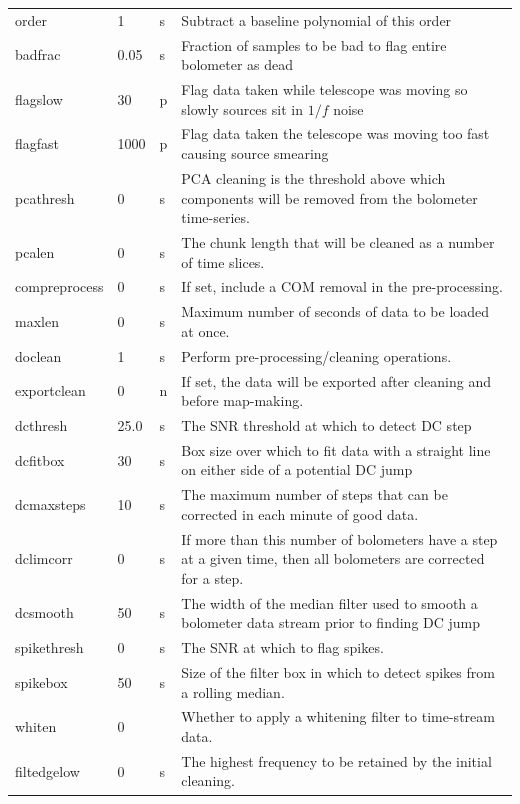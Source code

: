 \documentclass[twoside,11pt]{article}
\renewcommand{\_}{\texttt{\symbol{95}}}
\begin{document}
\begin{htmlonly}
\begin{table}
\begin{center}
\begin{footnotesize}
\begin{tabular}{|p{2.1cm}|p{0.8cm}|p{0.2cm}|p{11.2cm}|}
order & 1 &s &Subtract a baseline polynomial of this order\\
badfrac & 0.05 &s& Fraction of samples to be bad to flag entire bolometer
                        as dead\\
flagslow & 30 & p&Flag data taken while telescope was moving so slowly
                        sources sit in $1/f$ noise\\
flagfast & 1000 &p& Flag data taken the telescope was moving too fast causing source
                        smearing\\
pcathresh & 0 &s& PCA cleaning is the threshold above which components
                        will be removed from the bolometer time-series.\\
pcalen & 0 &s &The chunk length that will be cleaned as a number of time slices.\\
compreprocess& 0 &s& If set, include a COM removal in the pre-processing.\\
maxlen& 0 &s &Maximum number of seconds of data to be loaded at once.\\
doclean& 1 &s&Perform pre-processing/cleaning operations. \\
exportclean& 0 &n&If set, the data will be exported after cleaning and before map-making. \\
dcthresh & 25.0 &s& The SNR threshold at which to detect DC step\\
dcfitbox & 30 &s& Box size over which to fit data with a straight
                        line on either side of a potential DC jump\\
dcmaxsteps & 10 &s& The maximum number of steps that can be corrected
                        in each minute of good data.\\
dclimcorr & 0 &s& If more than this number of bolometers have a step at
                        a given time, then all bolometers are corrected for
                        a step.\\
dcsmooth & 50 &s& The width of the median filter used to smooth a
                        bolometer data stream prior to finding DC jump\\
spikethresh & 0 &s& The SNR at which to flag spikes.\\
spikebox & 50 &s& Size of the filter box in which to detect spikes from a rolling median.\\
whiten & 0 &&Whether to apply a whitening filter to time-stream data. \\
filt\_edgelow & 0 &s&The highest frequency to be retained by the initial cleaning. \\

\end{tabular}
\end{footnotesize}
\end{center}
\end{table}
\end{htmlonly}
\end{document}
